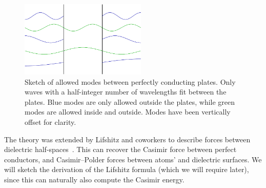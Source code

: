 \begin{figure}
\center
\includegraphics[width=6cm]{fig/intro/twoplanes_wave}
\caption[Allowed modes between parallel plates]
{Sketch of allowed modes between perfectly conducting plates. 
 Only waves with a half-integer number of wavelengths fit between the plates.
Blue modes are only allowed outside the plates, while green modes are allowed inside
and outside.  Modes have been vertically offset for clarity.  }
\label{fig:Casimir_sketch}
\end{figure}

The theory was extended by Lifshitz and coworkers to describe forces between dielectric half-spaces~\cite{Lifshitz1956,
Dzyaloshinskii1959,Dzyaloshinskii1961}.  This can recover the Casimir force between 
perfect conductors, and Casimir--Polder forces between atoms' and dielectric surfaces.  
We will sketch the derivation of the Lifshitz formula (which we will require later),
since this can naturally also compute the Casimir energy.



